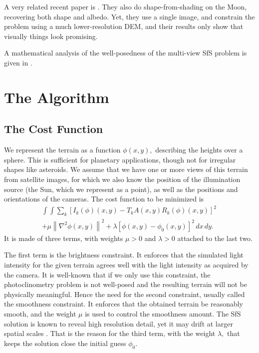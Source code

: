 \documentclass[12pt,oneside]{article}
\begin{document}
A very related recent paper is \cite{wu2016shape}. They also do
shape-from-shading on the Moon, recovering both shape and albedo. Yet,
they use a single image, and constrain the problem using a much
lower-resolution DEM, and their results only show that visually things
look promising.

A mathematical analysis of the well-posedness of the multi-view SfS
problem is given in \cite{jin20083}.

\section{The Algorithm}

\subsection{The Cost Function}

We represent the terrain as a function $\phi(x, y),$ describing the heights
over a sphere. This is sufficient for planetary applications,
though not for irregular shapes like asteroids. We assume that we have
one or more views of this terrain from satellite images, for which we
also know the position of the illumination source (the Sun, which we
represent as a point), as well as the positions and orientations of the
cameras. The cost function to be minimized is
\begin{multline}\label{cost}
\int\!\! \int \! \sum_k \left[ I_k(\phi)(x, y) - T_k A(x, y)
 R_k(\phi)(x, y) \right]^2\,  \\
+ \mu \left\|\nabla^2 \phi(x, y) \right\|^2  
+ \lambda  \left[ \phi(x, y) - \phi_0(x, y) \right]^2
\, dx\, dy.
\end{multline}
It is made of three terms, with weights $\mu > 0$ and $\lambda > 0$
attached to the last two.

The first term is the brightness constraint. It enforces that the simulated light intensity
for the given terrain agrees well with the light intensity as acquired
by the camera. It is well-known that if we only use this constraint, the
photoclinometry problem is not well-posed \citet{horn1990height} and the
resulting terrain will not be physically meaningful. Hence the need for
the second constraint, usually called the smoothness constraint. It
enforces that the obtained terrain
be reasonably smooth, and the weight $\mu$ is used to control the
smoothness amount. The SfS solution is known to reveal high resolution
detail, yet it may drift at larger spatial scales \cite{grumpe2014construction}.
That is the reason for the third term, with the weight $\lambda,$ 
that keeps the solution close the initial guess $\phi_0.$ 
\end{document}
